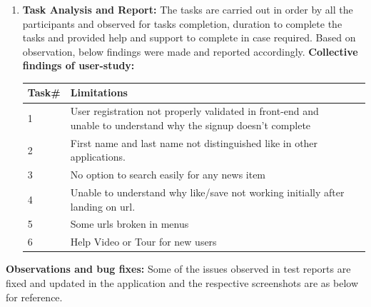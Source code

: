 \begin{enumerate}
  \item \textbf{Task Analysis and Report: } 
  The tasks are carried out in order by all the participants and observed for tasks completion, duration to complete the tasks and provided help and support to complete in case required.
  Based on observation, below findings were made and reported accordingly. \newline
\textbf{ Collective findings of user-study:}\newline
\begin{tabular}{ |p{2cm}|p{12cm}|p{12cm}|  }
\hline

\hline
Task\# &  Limitations \\
\hline
1 & User registration not properly validated in front-end and unable to understand why the signup doesn't complete\\
2 & First name and last name not distinguished like in other applications. \\
3 & No option to search easily for any news item \\
4 & Unable to understand why like/save not working initially after landing on url. \\
5 & Some urls broken in menus\\
6 & Help Video or Tour for new users \\

\hline
\end{tabular}\newline
 \end{enumerate}
 
\textbf{Observations and bug fixes:}\newline
 Some of the issues observed in test reports are fixed and updated in the application and the respective screenshots are as below for reference.
 
